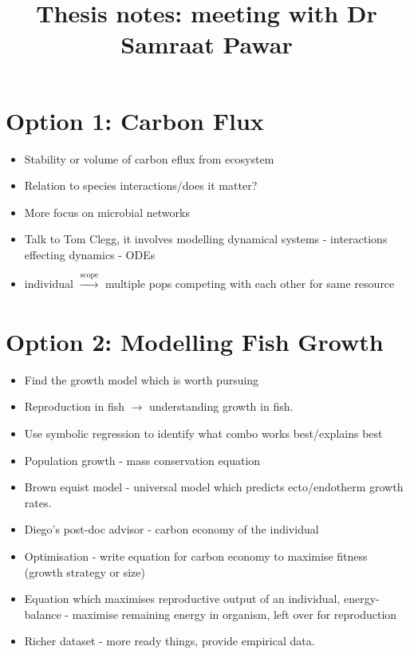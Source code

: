 \documentclass[11pt]{article}
\title{Thesis notes: meeting with Dr Samraat Pawar}
\begin{document}
    \maketitle
    \section*{Option 1: Carbon Flux}
        \begin{itemize}
            \item{Stability or volume of carbon eflux from ecosystem}
            \item{Relation to species interactions/does it matter?}
            \item{More focus on microbial networks}
            \item{Talk to Tom Clegg, it involves modelling dynamical systems - interactions effecting dynamics - ODEs}
            \item{individual $\xrightarrow[\text{}]{\text{scope}}$ multiple pops competing with each other for same resource}
        \end{itemize}
    \section*{Option 2: Modelling Fish Growth}
        \begin{itemize}
            \item{Find the growth model which is worth pursuing}
            \item Reproduction in fish $\rightarrow$ understanding growth in fish.
            \item{Use symbolic regression to identify what combo works best/explains best}
            \item{Population growth - mass conservation equation}
            \item{Brown equist model - universal model which predicts ecto/endotherm growth rates.}
            \item{Diego's post-doc advisor - carbon economy of the individual}
            \item{Optimisation - write equation for carbon economy to maximise fitness (growth strategy or size)}
            \item{Equation which maximises reproductive output of an individual, energy-balance - maximise remaining energy in organism, left over for reproduction}
            \item{Richer dataset - more ready things, provide empirical data.}
        \end{itemize}
\end{document}
